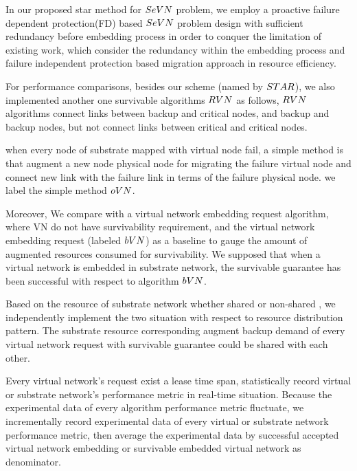 In our proposed star method for $SeVN$ problem, we employ a proactive failure dependent protection(FD) based $SeVN$ problem design with sufficient redundancy before embedding process in order to conquer the limitation of existing work, which consider the redundancy within the embedding process and failure independent protection based migration approach in resource efficiency.

For performance comparisons, besides our scheme (named by $STAR$), we also implemented another one survivable algorithms $RVN$ \cite{yeow2011designing} as follows, $RVN$ algorithms connect links between backup and critical nodes, and backup and backup nodes, but not connect links between critical and critical nodes.

when every node of substrate mapped with virtual node fail, a simple method is that augment a new node physical node for migrating the failure virtual node and connect new link with the failure link in terms of the failure physical node. we label the simple method $oVN$.

Moreover, We compare with a virtual network embedding request algorithm, where VN do not have survivability requirement, and the virtual network embedding request (labeled $bVN$) as a baseline to gauge the amount of augmented resources consumed for survivability. We supposed that when a virtual network is embedded in substrate network, the survivable guarantee has been successful with respect to algorithm $bVN$.



Based on the resource of substrate network whether shared or non-shared \cite{lu2006efficient}, we independently implement the two situation with respect to resource distribution pattern. The substrate resource corresponding augment backup demand of  every virtual network request with survivable guarantee  could be shared with each other.

Every virtual network's request exist a lease time span, statistically record virtual or substrate network's performance metric in real-time situation. Because the experimental data of every algorithm performance metric fluctuate, we incrementally record experimental data of every virtual or substrate network performance metric, then average the experimental data by successful accepted virtual network embedding or survivable embedded virtual network  as denominator.



